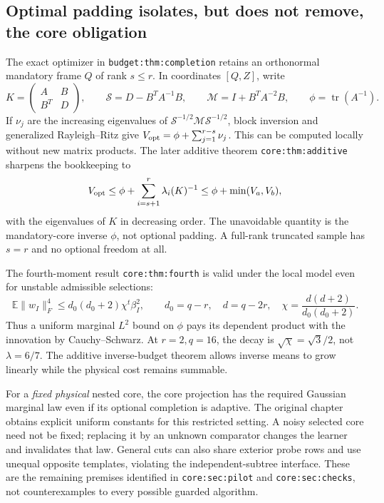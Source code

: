 \documentclass[11pt,oneside,openany,a4paper]{report}
\numberwithin{equation}{chapter}
\theoremstyle{definition}
\theoremstyle{remark}
\begin{document}
\subsection{Optimal padding isolates, but does not remove, the core obligation}

The exact optimizer in \texttt{budget:thm:completion} retains an
orthonormal mandatory frame $Q$ of rank $s\le r$.  In coordinates
$[Q,Z]$, write
\[
 K=\begin{pmatrix}A&B\\B^T&D\end{pmatrix},\qquad
 \mathcal S=D-B^TA^{-1}B,\qquad
 \mathcal M=I+B^TA^{-2}B,\qquad
 \phi=\operatorname{tr}(A^{-1}).
\]
If $\nu_j$ are the increasing eigenvalues of
$\mathcal S^{-1/2}\mathcal M\mathcal S^{-1/2}$, block inversion
and generalized Rayleigh--Ritz give
$V_{\rm opt}=\phi+\sum_{j=1}^{r-s}\nu_j$.
This can be computed locally without new matrix products.
The later additive theorem \texttt{core:thm:additive} sharpens
the bookkeeping to
\[
 V_{\rm opt}\le
 \phi+\sum_{i=s+1}^{r}\lambda_i(K)^{-1}
 \le\phi+\min(V_a,V_b),
\]
with the eigenvalues of $K$ in decreasing order.  The unavoidable
quantity is the mandatory-core inverse $\phi$, not optional
padding.  A full-rank truncated sample has $s=r$ and no optional
freedom at all.

The fourth-moment result \texttt{core:thm:fourth} is valid under
the local model even for unstable admissible selections:
\[
 \mathbb E\|w_I\|_F^4
 \le d_0(d_0+2)\chi^t\beta_I^2,\qquad
 d_0=q-r,\quad d=q-2r,\quad
 \chi=\frac{d(d+2)}{d_0(d_0+2)}.
\]
Thus a uniform marginal $L^2$ bound on $\phi$ pays its dependent
product with the innovation by Cauchy--Schwarz.  At $r=2,q=16$,
the decay is $\sqrt\chi=\sqrt3/2$, not $\lambda=6/7$.
The additive inverse-budget theorem allows inverse means to grow
linearly while the physical cost remains summable.

For a \emph{fixed physical} nested core, the core projection has
the required Gaussian marginal law even if its optional
completion is adaptive.  The original chapter obtains explicit
uniform constants for this restricted setting.  A noisy selected
core need not be fixed; replacing it by an unknown comparator
changes the learner and invalidates that law.  General cuts can
also share exterior probe rows and use unequal opposite
templates, violating the independent-subtree interface.  These
are the remaining premises identified in
\texttt{core:sec:pilot} and \texttt{core:sec:checks}, not
counterexamples to every possible guarded algorithm.
\end{document}
